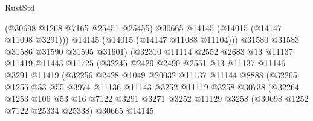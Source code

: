 \begin{lexlean}{RustStd}
\begin{coremodule}
                                  (@30698 @1268 @7165 @25451 @25455)
                                  @30665
                                  @14145
                                  (@14015 (@14147 @11098 @3291)))
                                @14145
                                (@14015 (@14147 @11088 @11104)))
                              @31580
                              @31583
                              @31586
                              @31590
                              @31595
                              @31601)
                            (@32310
                              @11114
                              @2552
                              @2683
                              @13
                              @11137
                              @11419
                              @11443
                              @11725
                              (@32245
                                @2429
                                @2490
                                @2551
                                @13
                                @11137
                                @11146
                                @3291
                                @11419
                                (@32256
                                  @2428
                                  @1049
                                  @20032
                                  @11137
                                  @11144
                                  @8888
                                  (@32265
                                    @1255
                                    @53
                                    @55
                                    @3974
                                    @11136
                                    @11143
                                    @3252
                                    @11119
                                    @3258
                                    @30738
                                    (@32264
                                      @1253
                                      @106
                                      @53
                                      @16
                                      @7122
                                      @3291
                                      @3271
                                      @3252
                                      @11129
                                      @3258
                                      (@30698 @1252 @7122 @25334 @25338)
                                      @30665
                                      @14145

\end{coremodule}
\end{lexlean}
